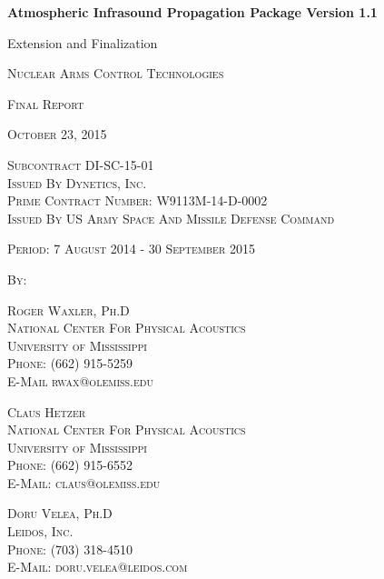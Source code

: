 \begin{center}
\begin{Large} 
{\bf 
Atmospheric Infrasound Propagation Package Version 1.1

Extension and Finalization 
}
\end{Large}
\end{center}

\begin{center}
\begin{large}
\textsc{Nuclear Arms Control Technologies}

\smallskip

\textsc{Final Report}

\smallskip

\textsc{October 23, 2015}

\smallskip

\textsc{
Subcontract DI-SC-15-01\\
Issued By Dynetics, Inc.\\
Prime Contract Number:  W9113M-14-D-0002\\
Issued By US Army Space And Missile Defense Command
}

\smallskip

\textsc{Period:  7 August 2014 - 30 September 2015}

\smallskip

\textsc{By:}

\smallskip

\textsc{
Roger Waxler, Ph.D\\
National Center For Physical Acoustics\\
University of Mississippi\\
Phone:  (662) 915-5259\\
E-Mail  rwax@olemiss.edu 
}

\smallskip

\textsc{
Claus Hetzer\\
National Center For Physical Acoustics\\
University of Mississippi\\
Phone:  (662) 915-6552\\
E-Mail:  claus@olemiss.edu 
}

\smallskip

\textsc{
Doru Velea, Ph.D\\
Leidos, Inc.\\
Phone:  (703) 318-4510\\
E-Mail:  doru.velea@leidos.com 
}
\end{large}
\end{center}


